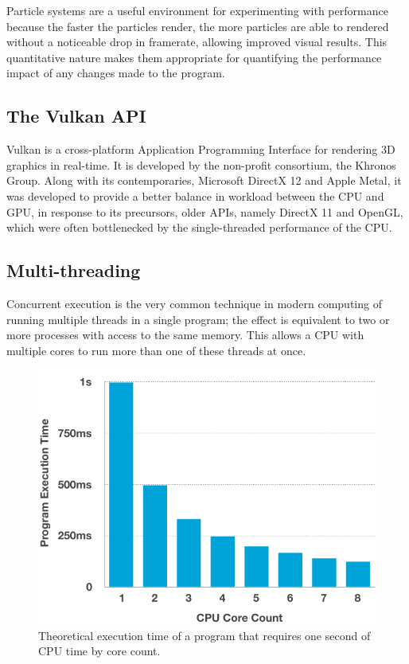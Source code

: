 \documentclass[11pt, a4paper, twocolumn]{article}
\begin{document}
Particle systems are a useful environment for experimenting with performance because the faster the particles render, the more particles are able to rendered without a noticeable drop in framerate, allowing improved visual results. This quantitative nature makes them appropriate for quantifying the performance impact of any changes made to the program.

\subsection{The Vulkan API}

Vulkan is a cross-platform Application Programming Interface for rendering 3D graphics in real-time. It is developed by the non-profit consortium, the Khronos Group. Along with its contemporaries, Microsoft DirectX 12 and Apple Metal, it was developed to provide a better balance in workload between the CPU and GPU, in response to its precursors, older APIs, namely DirectX 11 and OpenGL, which were often bottlenecked by the single-threaded performance of the CPU.


\subsection{Multi-threading}

Concurrent execution is the very common technique in modern computing of running multiple threads in a single program; the effect is equivalent to two or more processes with access to the same memory. This allows a CPU with multiple cores to run more than one of these threads at once.

\begin{figure}[h]
\includegraphics[width=\linewidth]{cpu_cores}
\caption{Theoretical execution time of a program that requires one second of CPU time by core count.}
\label{fig:cpu_cores}
\end{figure}
\end{document}
